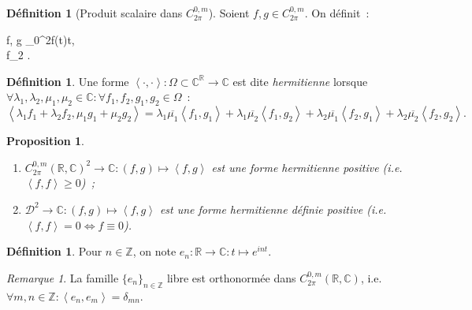 \documentclass{report}
\newtheorem{prp}[thm]{Proposition}
\theoremstyle{definition}
\newtheorem{déf}[thm]{Définition}
\theoremstyle{remark}
\newtheorem*{rmq}{Remarque}
\numberwithin{equation}{section}
\newcommand{\C}{\mathbb C}
\newcommand{\R}{\mathbb R}
\newcommand{\Z}{\mathbb Z}
\newcommand{\scpr}[2]{\left\langle #1, #2\right\rangle}
\newcommand{\CzmT}[1]{C^{0,m}_{#1}}
\newcommand{\Czm}{\CzmT{2\pi}}
\begin{document}
			\begin{déf}[Produit scalaire dans $\Czm$] Soient $f, g \in \Czm$. On définit~:
			\begin{subnumcases}{}
				\scpr fg \coloneqq {}\int_0^{2\pi}f(t)\dif t, \\
				\norm f_2 \coloneqq \sqrt {\scpr ff}.
			\end{subnumcases}
			\end{déf}

			\begin{déf} Une forme $\scpr \cdot\cdot : \Omega \subset \C^\R \to \C$ est dite \textit{hermitienne} lorsque
			$\forall \lambda_1, \lambda_2, \mu_1, \mu_2 \in \C : \forall f_1, f_2, g_1, g_2 \in \Omega$~:
			\begin{equation}
					\scpr {\lambda_1 f_1 + \lambda_2 f_2}{\mu_1 g_1 + \mu_2 g_2}
						= \lambda_1\overline {\mu_1}\scpr {f_1}{g_1}
						+ \lambda_1\overline {\mu_2}\scpr {f_1}{g_2}
						+ \lambda_2\overline {\mu_1}\scpr {f_2}{g_1}
						+ \lambda_2\overline {\mu_2}\scpr {f_2}{g_2}.
			\end{equation}
			\end{déf}

			\begin{prp}\label{prp:prop scpr Czm}~
				\begin{enumerate}
					\item $\Czm(\R, \C)^2 \to \C : (f, g) \mapsto \scpr fg$ est une forme hermitienne positive (i.e. $\scpr ff \geq 0$)~;
					\item $\mathcal D^2 \to \C : (f, g) \mapsto \scpr fg$ est une forme hermitienne définie positive (i.e. $\scpr ff = 0 \iff f \equiv 0$).
				\end{enumerate}
			\end{prp}

			\begin{déf} Pour $n \in \Z$, on note $e_n : \R \to \C : t \mapsto e^{int}$.
			\end{déf}

			\begin{rmq} La famille $\{e_n\}_{n \in \Z}$ libre est orthonormée dans $\Czm(\R, \C)$, i.e. $\forall m, n \in \Z : \scpr {e_n}{e_m} = \delta_{mn}$.
			\end{rmq}
\end{document}

